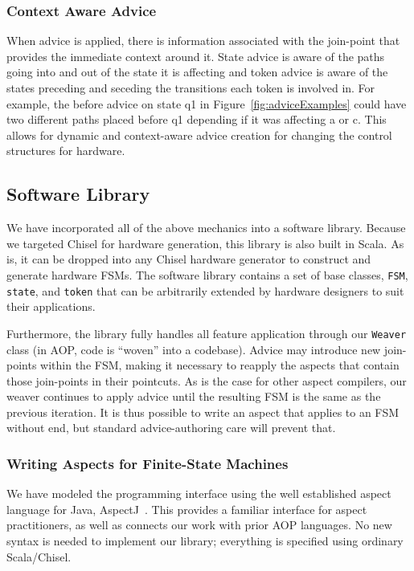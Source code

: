 \documentclass[conference]{IEEEtran}
\begin{document}
\subsubsection{Context Aware Advice}  When advice is applied, there is information associated with the join-point that provides
 the immediate context around it. State advice is aware of the paths going into and out of the state it is affecting and token advice is aware of the states preceding and seceding the transitions each token is involved in. For example, the before advice on state q1 in Figure~\ref{fig:adviceExamples} could have two different paths placed before q1 depending if it was affecting a or c. This allows for dynamic and context-aware advice creation for changing the control structures for hardware.

\subsection{Software Library}\label{sec:foam}
We have incorporated all of the above mechanics into a software library. Because we targeted Chisel for hardware generation, this library is also built in Scala. As is, it can be dropped into any Chisel hardware generator to construct and generate hardware FSMs. The software library contains a set of base classes, \texttt{FSM}, \texttt{state}, and \texttt{token} that can be arbitrarily extended by hardware designers to suit their applications. 

Furthermore, the library fully handles all feature application through our \texttt{Weaver} class (in AOP, code is ``woven'' into a codebase). Advice may introduce new join-points within the FSM, making it necessary to reapply the aspects that contain those join-points in their pointcuts. As is the case for other aspect compilers, our weaver continues to apply advice until the resulting FSM is the same as the previous iteration.  It is thus possible to write an aspect that applies to an FSM without end, but standard advice-authoring care will prevent that.

\subsubsection{Writing Aspects for Finite-State Machines}
We have modeled the programming interface using the well established aspect language for Java, AspectJ~\cite{AspectJ:01}. This provides a familiar interface for aspect practitioners, as well as connects our work with prior AOP languages. No new syntax is needed to implement our library; everything is specified using ordinary Scala/Chisel.
\end{document}

